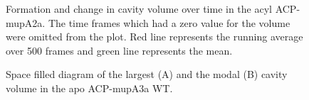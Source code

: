\begin{singlespacing}
		\setlength\fboxsep{5pt}
		\setlength\fboxrule{1.5pt}
		\begin{figure}[htbp]
		\centering
		\caption[Formation and change in cavity volume over time in the acyl ACP-mupA2a.]{Formation and change in cavity volume over time in the acyl ACP-mupA2a. The time frames which had a zero value for the volume were omitted from the plot. Red line represents the running average over 500 frames and green line represents the mean.}
		\label{fig:CavityVolumeACP2_nonzero}
		\end{figure}		
		
		\setlength\fboxsep{5pt}
		\setlength\fboxrule{1.5pt}
		\begin{figure}[htbp]
		\centering
		\caption[Space filled diagram of the largest and the modal cavity volume in the apo ACP-mupA3a WT.]{Space filled diagram of the largest (A) and the modal (B) cavity volume in the apo ACP-mupA3a WT.}
		\label{fig:acp_wild}
		\end{figure}


\end{singlespacing}
